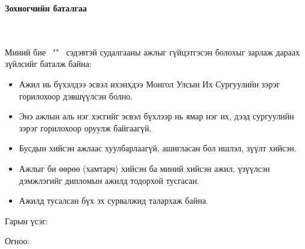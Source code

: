 \makefrontpage
\maketitle
{}

\doublespace

\begin{huge}
\textbf{Зохиогчийн баталгаа}
\end{huge} \\ \ \\ 
\doublespace
Миний бие \@author \ "\@title" \ сэдэвтэй судалгааны ажлыг гүйцэтгэсэн болохыг зарлаж дараах зүйлсийг баталж байна:
\begin{itemize}
\item Ажил нь бүхэлдээ эсвэл ихэнхдээ Монгол Улсын Их Сургуулийн зэрэг горилохоор дэвшүүлсэн болно.
\item Энэ ажлын аль нэг хэсгийг эсвэл бүхлээр нь ямар нэг их, дээд сургуулийн зэрэг горилохоор оруулж байгаагүй.
\item Бусдын хийсэн ажлаас хуулбарлаагүй, ашигласан бол ишлэл, зүүлт хийсэн.
\item Ажлыг би өөрөө (хамтарч) хийсэн ба миний хийсэн ажил, үзүүлсэн дэмжлэгийг дипломын ажилд тодорхой тусгасан. 
\item Ажилд тусалсан бүх эх сурвалжид талархаж байна. 
\end{itemize} 


Гарын үсэг: \underline{\hspace{5cm}} 

Огноо: 	\ \ \underline{\hspace{3cm}}

\setcounter{tocdepth}{1}
\tableofcontents

\listoffigures

\listoftables

\lstlistoflistings

\newpage
\newpage

\renewcommand{\cftlabel}{Зураг}


\doublespace
{}
